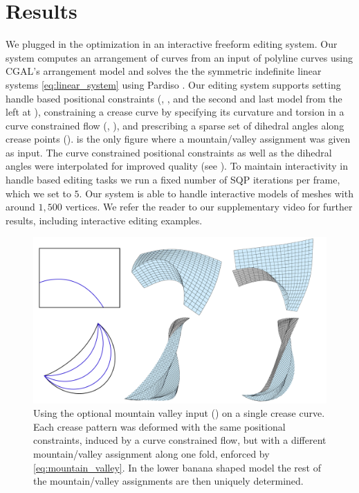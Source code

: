 \section{Results} \label{sec:results}
We plugged in the optimization \label{eq:opt} in an interactive freeform editing system. Our system computes an arrangement of curves from an input of polyline curves using CGAL's arrangement model \cite{cgal,cgal_arr1,cgal_arr2} and solves the the symmetric indefinite  linear systems \eqref{eq:linear_system} using Pardiso \cite{PARDISO1,PARDISO2,PARDISO3}. Our editing system supports setting handle based positional constraints (, , and the second and last model from the left at ), constraining a crease curve by specifying its curvature and torsion in a curve constrained flow (, ), and prescribing a sparse set of dihedral angles along crease points ().  is the only figure where a mountain/valley assignment was given as input. The curve constrained positional constraints as well as the dihedral angles were interpolated for improved quality (see ). To maintain interactivity in handle based editing tasks we run a fixed number of SQP iterations per frame, which we set to $5$. Our system is able to handle interactive models of meshes with around $1,500$ vertices. We refer the reader to our supplementary video for further results, including interactive editing examples. 

\begin{figure} [h]
	\centering
	\includegraphics[width=\linewidth]{figures/MV_bias_modeling}
	\caption{Using the optional mountain valley input () on a single crease curve. Each crease pattern was deformed with the same positional constraints, induced by a curve constrained flow, but with a different mountain/valley assignment along one fold, enforced by \eqref{eq:mountain_valley}. In the lower banana shaped model the rest of the mountain/valley assignments are then uniquely determined.}
	\label{fig:MV_bias_modeling}
\end{figure}

